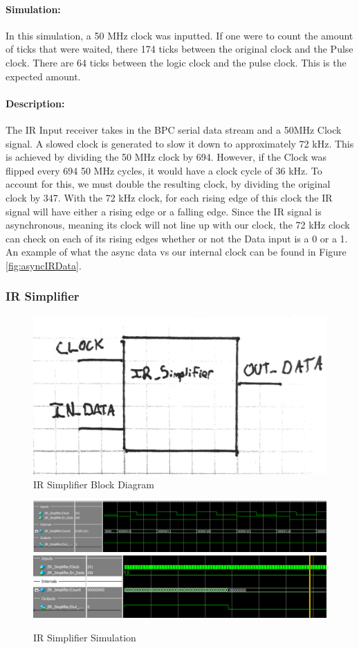 \documentclass[]{article}
\begin{document}
\paragraph{Simulation:} In this simulation, a 50 MHz clock was inputted. If one were to count the amount of ticks that were waited,
there 174 ticks between the original clock and the Pulse clock. There are 64 ticks between the logic clock and the pulse clock. This is the expected amount. 
\paragraph{Description:} The IR Input receiver takes in the BPC serial data stream and a 50MHz Clock signal. A slowed clock is generated to slow it down to approximately 72 kHz.
This is achieved by dividing the 50 MHz clock by 694. However, if the Clock was flipped every 694 50 MHz cycles, it would have a clock cycle of 36 kHz. 
To account for this, we must double the resulting clock, by dividing the original clock by 347.
With the 72 kHz clock, for each rising edge of this clock the IR signal will have either a rising edge or a falling edge. 
Since the IR signal is asynchronous, meaning its clock will not line up with our clock, the 72 kHz clock can check on each of its rising edges whether or not the Data input is a 0 or a 1.
An example of what the async data vs our internal clock can be found in Figure \ref{fig:asyncIRData}.

\subsubsection{IR Simplifier}
\label{irsimplifier}
\begin{figure}[H]\centering
    \includegraphics[width=0.6\linewidth]{figures/IR_Simplifier_Block.jpg}
    \caption{IR Simplifier Block Diagram}
    \label{fig:irSimplifierBlock}
\end{figure}
\begin{figure}[H]\centering
    \includegraphics[width=\linewidth]{figures/IR_Simplifier_Sim1.png}
    \includegraphics[width=\linewidth]{figures/IR_Simplifier_Sim2.png}
    \caption{IR Simplifier Simulation}
    \label{fig:irSimplifierSim}
\end{figure}
\end{document}
